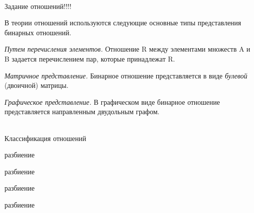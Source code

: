 \begin{frame}{\\Задание отношений}!!!!
	
	
	
	\topline
	\justifying
	
	В теории отношений используются следующие основные типы представления бинарных отношений.\\
	
	\begin{textitemize}
		\item {\textit{Путем перечисления элементов.} Отношение R между элементами множеств A и B задается перечислением пар, которые принадлежат R.}
		
		\item
		{ \textit{Матричное представление.} Бинарное отношение представляется в виде \textit{булевой} (двоичной) матрицы.} 
		
		\item{ \textit {Графическое представление.} В графическом виде бинарное отношение представляется направленным двудольным графом.}
		
	\end{textitemize}
	
\end{frame}

\begin{frame}{\\Классификация отношений}
	
	\topline
	\justifying
	
	\begin{SCn}
		
		\begin{scnrelfromset}{разбиение}
		\end{scnrelfromset}
		
		\begin{scnrelfromset}{разбиение}
		\end{scnrelfromset}
		
		\begin{scnrelfromset}{разбиение}
		\end{scnrelfromset}
		
		\begin{scnrelfromset}{разбиение}
		\end{scnrelfromset}
		
	\end{SCn}
\vspace{-2em}
\end{frame}

